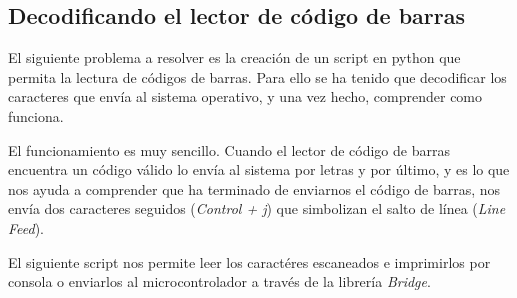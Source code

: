\subsection{Decodificando el lector de código de barras}

El siguiente problema a resolver es la creación de un script en python que permita la lectura de códigos de barras. Para ello se ha tenido que decodificar los caracteres que envía al sistema operativo, y una vez hecho, comprender como funciona.

El funcionamiento es muy sencillo. Cuando el lector de código de barras encuentra un código válido lo envía al sistema por letras y por último, y es lo que nos ayuda a comprender que ha terminado de enviarnos el código de barras, nos envía dos caracteres seguidos (\emph{Control + j}) que simbolizan el salto de línea (\emph{Line Feed}).

El siguiente script nos permite leer los caractéres escaneados e imprimirlos por consola o enviarlos al microcontrolador a través de la librería \emph{Bridge}.

